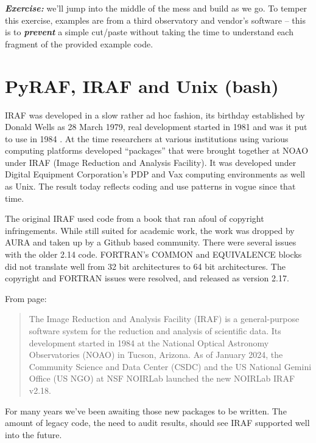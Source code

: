 \documentclass[letter,11pt,oneside]{article}
\begin{document}
\textbf{\emph{Exercise:}} we'll jump into the middle of the mess and
build as we go. To temper this exercise, examples are from a third
observatory and vendor's software -- this is to
\textbf{\emph{prevent}} a simple cut/paste without taking the time to
understand each fragment of the provided example code.


\section{PyRAF, IRAF and Unix (bash)}

IRAF was developed in a slow rather ad hoc fashion, its birthday
established by Donald Wells \cite{FITSBirthday} as 28 March 1979,
real development started in 1981 and was it put to use in 1984
\cite{1993ASPC...52..173T}.  At the time researchers at various
institutions using various computing platforms developed ``packages''
that were brought together at NOAO under IRAF (Image Reduction and
Analysis Facility). It was developed under Digital Equipment
Corporation's PDP and Vax computing environments as well as Unix. The
result today reflects coding and use patterns in vogue since that
time. 

The original IRAF used code from a book that ran afoul of copyright
infringements. While still suited for academic work, the work
was dropped by AURA and taken up by a Github based community. There
were several issues with the older 2.14 code. FORTRAN's COMMON and
EQUIVALENCE blocks did not translate well from 32 bit architectures
to 64 bit architectures. The copyright and FORTRAN issues were resolved,
and released as version 2.17.

\clearpage
From \cite{NOIRLabReleaseNote} page:

\begin{quote}
The Image Reduction and Analysis Facility (IRAF) is a general-purpose
software system for the reduction and analysis of scientific data. Its
development started in 1984 at the National Optical Astronomy
Observatories (NOAO) in Tucson, Arizona. As of January 2024, the
Community Science and Data Center (CSDC) and the US National Gemini
Office (US NGO) at NSF NOIRLab launched the new NOIRLab IRAF v2.18.
\end{quote}

For many years we've been awaiting those new packages to be written.
The amount of legacy code, the need to audit results, should see
IRAF supported well into the future.
\end{document}
